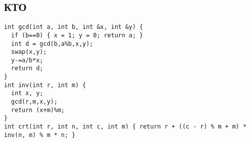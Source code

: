 \subsection{КТО}
\begin{lstlisting}
int gcd(int a, int b, int &x, int &y) {
  if (b==0) { x = 1; y = 0; return a; }
  int d = gcd(b,a%b,x,y);
  swap(x,y);
  y-=a/b*x;
  return d;
}
int inv(int r, int m) {
  int x, y;
  gcd(r,m,x,y);
  return (x+m)%m;
}
int crt(int r, int n, int c, int m) { return r + ((c - r) % m + m) * inv(n, m) % m * n; }
\end{lstlisting}
